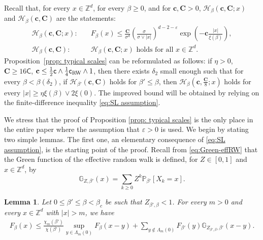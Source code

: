 \documentclass[11pt,a4paper]{article}
\numberwithin{equation}{section}
\theoremstyle{plain}
\newtheorem{Lem}[Thm]{Lemma}
\theoremstyle{definition}
\newcommand\1{\mathds{1}}
\newcommand\bfc{\mathbf{c}}
\newcommand\bfC{\mathbf{C}}
\newcommand\crw{\mathsf{c}_{\textup{RW}}}
\newcommand\CGreen{\mathsf{C}}
\newcommand\cGreen{\mathsf{c}}
\begin{document}
Recall that, for every $x\in \mathbb Z^d$, for every $\beta \ge 0$, and for $\bfc,\bfC>0$,
$\mathcal H_\beta(\bfc,\bfC;x)$ and $\mathcal H_\beta(\bfc,\bfC)$
are the statements:
\begin{align}
	\mathcal H_\beta(\bfc,\bfC;x): &\quad F_{\beta}(x)\leq \frac{\bfC}{\sigma^d}\left(\frac{\sigma}{\sigma \vee|x|}\right)^{d-2-\varepsilon}
\exp\left(-\bfc\frac{|x|}{\xi(\beta)}\right) ,
\\
	\mathcal H_\beta(\bfc,\bfC): &\quad
    \text{$\mathcal H_\beta(\bfc,\bfC;x)$ holds for all $x\in \mathbb Z^d$}.
\end{align}
Proposition~\ref{prop: typical scales} can be reformulated as follows: if $\eta>0$, $\bfC\geq 16\CGreen$, $\bfc\leq \tfrac{1}{2}\cGreen\wedge \tfrac{1}{4}\crw\wedge 1$, then there exists $\delta_2$ small enough such that for every $\beta<\beta(\delta_2)$, if $\mathcal H_{\beta'}(\bfc,\bfC)$ holds for $\beta'\leq \beta$, then $\mathcal H_{\beta}(\bfc,\tfrac{\bfC}{8};x)$ holds for every $|x|\geq \eta\xi(\beta)\vee 2\xi(0)$.
The improved bound will be obtained by relying on the finite-difference inequality \eqref{eq:SL assumption}.

We stress that the proof of Proposition \ref{prop: typical scales} is the only place in the entire paper where the assumption that $\varepsilon>0$ is used.
We begin by stating two simple lemmas. The first one, an elementary consequence of \eqref{eq:SL assumption}, is the starting point of the proof.  Recall from \eqref{eq:Green-effRW} that the Green function of the effective random
walk is defined, for $Z\in [0,1]$ and $x\in \mathbb Z^d$, by
\begin{equation}
    \mathbb G_{Z,\beta'}(x)=\sum_{k\geq 0}Z^k \mathbb P_{\beta'}[X_k=x].
\end{equation}


\begin{Lem}
\label{lemma:typ-decomp}
Let $0 \le\beta' \le \beta<\beta_c$ be such that $Z_{\beta',\beta}< 1$. For every  $m >0$ and every $x\in \mathbb Z^d$ with $|x| > m$, we have
\begin{align}
\label{eq:typ1}
    F_\beta(x)
    \le
    \frac{\chi_m(\beta')}{\chi(\beta')} \sup_{y \in \Lambda_m(0)} F_\beta(x-y)
    +
    \sum_{y \notin \Lambda_{m}(0)} F_{\beta'}(y)\mathbb G_{Z_{\beta',\beta},\beta'}(x-y)
    .
\end{align}
\end{Lem}
\end{document}
